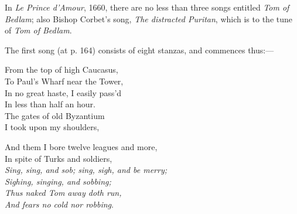 
In \textit{Le Prince d’Amour}, 1660, there are no less than three songs entitled
\textit{Tom of Bedlam}; also Bishop Corbet’s song, \textit{The distracted Puritan}, which is to
the tune of \textit{Tom of Bedlam}.

The first song (at p. 164) consists of eight stanzas, and commences thus:—
\settowidth{\versewidth}{And them I bore twelve leagues and more,}
\begin{dcverse}\begin{altverse}
From the top of high Caucasus,\\
To Paul’s Wharf near the Tower,\\
In no great haste, I easily pass’d\\
In less than half an hour.\\
The gates of old Byzantium\\
I took upon my shoulders,
\end{altverse}

\begin{altverse}
And them I bore twelve leagues and more,\\
In spite of Turks and soldiers, \\
\textit{Sing, sing, and sob; sing, sigh, and be merry;\\
Sighing, singing, and sobbing;\\
Thus naked Tom away doth run,\\
And fears no cold nor robbing}.
\end{altverse}
\end{dcverse}

